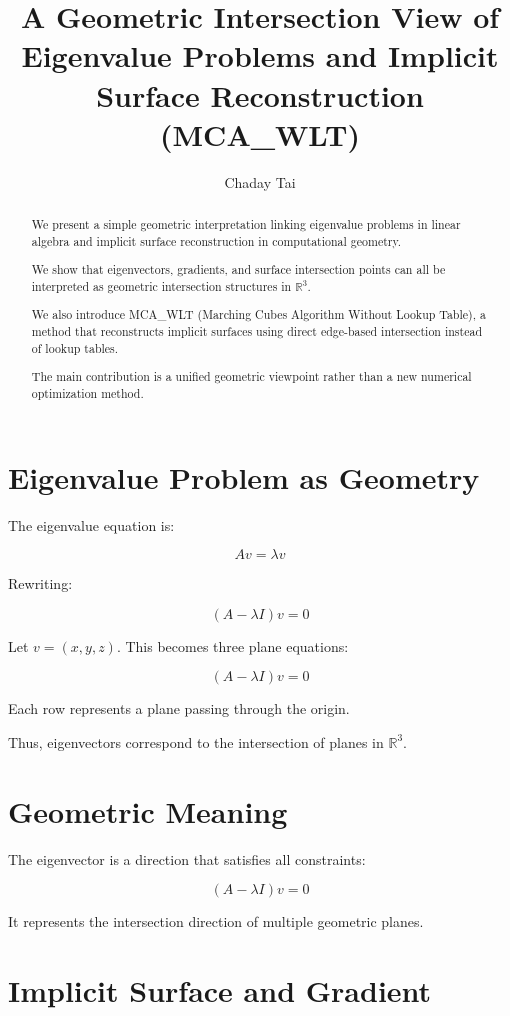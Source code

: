 \documentclass[11pt]{article}
\title{A Geometric Intersection View of Eigenvalue Problems and Implicit Surface Reconstruction (MCA\_WLT)}
\author{Chaday Tai}
\date{}
\begin{document}
\maketitle

\begin{abstract}
We present a simple geometric interpretation linking eigenvalue problems in linear algebra and implicit surface reconstruction in computational geometry.

We show that eigenvectors, gradients, and surface intersection points can all be interpreted as geometric intersection structures in $\mathbb{R}^3$.

We also introduce MCA\_WLT (Marching Cubes Algorithm Without Lookup Table), a method that reconstructs implicit surfaces using direct edge-based intersection instead of lookup tables.

The main contribution is a unified geometric viewpoint rather than a new numerical optimization method.
\end{abstract}

\section{Eigenvalue Problem as Geometry}

The eigenvalue equation is:

\[
Av = \lambda v
\]

Rewriting:

\[
(A - \lambda I)v = 0
\]

Let $v = (x,y,z)$. This becomes three plane equations:

\[
(A - \lambda I)v = 0
\]

Each row represents a plane passing through the origin.

Thus, eigenvectors correspond to the intersection of planes in $\mathbb{R}^3$.

\section{Geometric Meaning}

The eigenvector is a direction that satisfies all constraints:

\[
(A - \lambda I)v = 0
\]

It represents the intersection direction of multiple geometric planes.

\section{Implicit Surface and Gradient}
\end{document}
